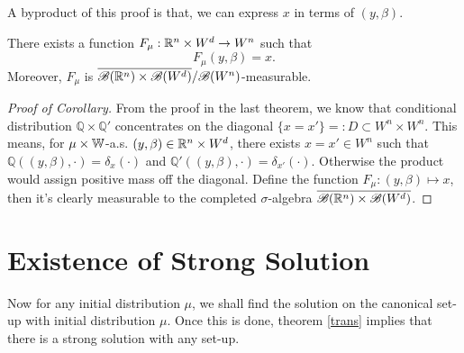 \documentclass[8pt,onesided]{article}
\begin{document}
A byproduct of this proof is that, we can express $x$ in terms of $(y,\beta)$.

\begin{coro}
There exists a function $F_{\mu}:\mathbb{R}^n\times W^d\to W^n$ such that
\begin{equation*}
    F_{\mu}(y,\beta)=x.
\end{equation*}
Moreover, $F_{\mu}$ is $\overline{\mathscr{B}(\mathbb{R}^n)\times\mathscr{B}(W^d)}/\mathscr{B}(W^n)$-measurable.
\end{coro}

\begin{proof}[Proof of Corollary] From the proof in the last theorem, we know that conditional distribution $\mathbb{Q}\times \mathbb{Q}'$ concentrates on the diagonal $\{x=x'\}=:D\subset W^n \times W^n$. This means, for $\mu\times \mathbb{W}$-a.s. $(y,\beta)\in \mathbb{R}^n\times W^d$, there exists $x=x'\in W^n$ such that $\mathbb{Q}((y,\beta),\cdot)= \delta_{x}(\cdot)$ and $\mathbb{Q}'((y,\beta),\cdot)=\delta_{x'}(\cdot)$. Otherwise the product would assign positive mass off the diagonal. Define the function $F_{\mu}:(y,\beta)\mapsto x$, then it's clearly measurable to the completed $\sigma$-algebra $\overline{\mathscr{B}(\mathbb{R}^n)\times\mathscr{B}(W^d)}$.
\end{proof}


\section{Existence of Strong Solution}


Now for any initial distribution $\mu$, we shall find the solution on the canonical set-up with initial distribution $\mu$. Once this is done, theorem \ref{trans} implies that there is a strong solution with any set-up. 
\end{document}
